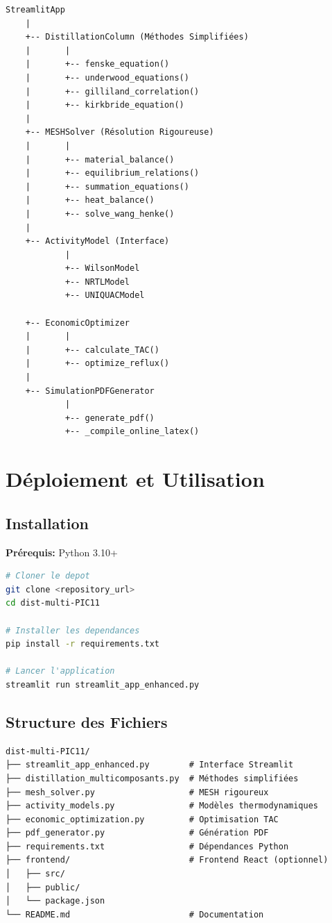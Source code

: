 \documentclass[11pt,a4paper]{article}
\begin{document}
\begin{verbatim}
StreamlitApp
    |
    +-- DistillationColumn (Méthodes Simplifiées)
    |       |
    |       +-- fenske_equation()
    |       +-- underwood_equations()
    |       +-- gilliland_correlation()
    |       +-- kirkbride_equation()
    |
    +-- MESHSolver (Résolution Rigoureuse)
    |       |
    |       +-- material_balance()
    |       +-- equilibrium_relations()
    |       +-- summation_equations()
    |       +-- heat_balance()
    |       +-- solve_wang_henke()
    |
    +-- ActivityModel (Interface)
            |
            +-- WilsonModel
            +-- NRTLModel
            +-- UNIQUACModel

    +-- EconomicOptimizer
    |       |
    |       +-- calculate_TAC()
    |       +-- optimize_reflux()
    |
    +-- SimulationPDFGenerator
            |
            +-- generate_pdf()
            +-- _compile_online_latex()
\end{verbatim}

\section{Déploiement et Utilisation}

\subsection{Installation}

\textbf{Prérequis:} Python 3.10+

\begin{lstlisting}[language=bash]
# Cloner le depot
git clone <repository_url>
cd dist-multi-PIC11

# Installer les dependances
pip install -r requirements.txt

# Lancer l'application
streamlit run streamlit_app_enhanced.py
\end{lstlisting}

\subsection{Structure des Fichiers}

\begin{verbatim}
dist-multi-PIC11/
├── streamlit_app_enhanced.py        # Interface Streamlit
├── distillation_multicomposants.py  # Méthodes simplifiées
├── mesh_solver.py                   # MESH rigoureux
├── activity_models.py               # Modèles thermodynamiques
├── economic_optimization.py         # Optimisation TAC
├── pdf_generator.py                 # Génération PDF
├── requirements.txt                 # Dépendances Python
├── frontend/                        # Frontend React (optionnel)
│   ├── src/
│   ├── public/
│   └── package.json
└── README.md                        # Documentation
\end{verbatim}
\end{document}
